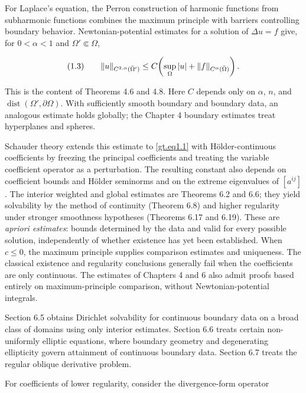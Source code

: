 For Laplace's equation, the Perron construction of harmonic functions from
subharmonic functions combines the maximum principle with barriers controlling
boundary behavior. Newtonian-potential estimates for a solution of
$\Delta u=f$ give, for $0<\alpha<1$ and $\Omega'\Subset\Omega$,

\begin{equation}\label{gt.eq1.5}\dcref{(1.3)}\group{chapter-1}\source{gilbarg-trudinger:page-0015}
(1.3)\qquad \|u\|_{C^{2,\alpha}(\bar{\Omega}')} \leq C\!\left(\sup_{\Omega}|u|+\|f\|_{C^{\alpha}(\bar{\Omega})}\right).
\end{equation}

This is the content of Theorems 4.6 and 4.8. Here $C$ depends only on $\alpha$,
$n$, and $\operatorname{dist}(\Omega',\partial\Omega)$. With sufficiently smooth
boundary and boundary data, an analogous estimate holds globally; the Chapter 4
boundary estimates treat hyperplanes and spheres.

Schauder theory extends this estimate to \eqref{gt.eq1.1} with H\"older-continuous
coefficients by freezing the principal coefficients and treating the variable
coefficient operator as a perturbation. The resulting constant also depends on
coefficient bounds and H\"older seminorms and on the extreme eigenvalues of
$[a^{ij}]$. The interior weighted and global estimates are Theorems 6.2 and 6.6;
they yield solvability by the method of continuity (Theorem 6.8) and higher
regularity under stronger smoothness hypotheses (Theorems 6.17 and 6.19).
These are \emph{apriori estimates}: bounds determined by the data and valid for
every possible solution, independently of whether existence has yet been
established. When $c\leq0$, the maximum principle supplies comparison estimates
and uniqueness. The classical existence and regularity conclusions generally
fail when the coefficients are only continuous. The estimates of Chapters 4 and
6 also admit proofs based entirely on maximum-principle comparison, without
Newtonian-potential integrals.

Section 6.5 obtains Dirichlet solvability for continuous boundary data on a broad
class of domains using only interior estimates. Section 6.6 treats certain
non-uniformly elliptic equations, where boundary geometry and degenerating
ellipticity govern attainment of continuous boundary data. Section 6.7 treats the
regular oblique derivative problem.

For coefficients of lower regularity, consider the divergence-form operator

